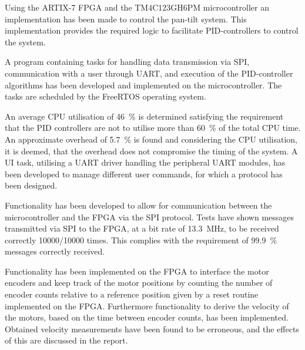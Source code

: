 \documentclass[../../main.tex]{subfiles}
\begin{document}

Using the ARTIX-7 FPGA and the TM4C123GH6PM microcontroller an implementation has been made to control the pan-tilt system. This implementation provides the required logic to facilitate PID-controllers to control the system.  

 

A program containing tasks for handling data transmission via SPI, communication with a user through UART, and execution of the PID-controller algorithms has been developed and implemented on the microcontroller. The tasks are scheduled by the FreeRTOS operating system.

An average CPU utilisation of \SI{46}{\percent} is determined satisfying the requirement that the PID controllers are not to utilise more than \SI{60}{\percent} of the total CPU time. An approximate overhead of \SI{5,7}{\percent} is found and considering the CPU utilisation, it is deemed, that the overhead does not compromise the timing of the system. A UI task, utilising a UART driver handling the peripheral UART modules, has been developed to manage different user commands, for which a protocol has been designed.

Functionality has been developed to allow for communication between the microcontroller and the FPGA via the SPI protocol. 
Tests have shown messages transmitted via SPI to the FPGA, at a bit rate of \SI{13.3}{\mega\hertz}, to be received correctly 10000/10000 times. This complies with the requirement of \SI{99,9}{\percent} messages correctly received.

Functionality has been implemented on the FPGA to interface the motor encoders and keep track of the motor positions by counting the number of encoder counts relative to a reference position given by a reset routine implemented on the FPGA. Furthermore functionality to derive the velocity of the motors, based on the time between encoder counts, has been implemented.
Obtained velocity measurements have been found to be erroneous, and the effects of this are discussed in the report.   
\end{document}
